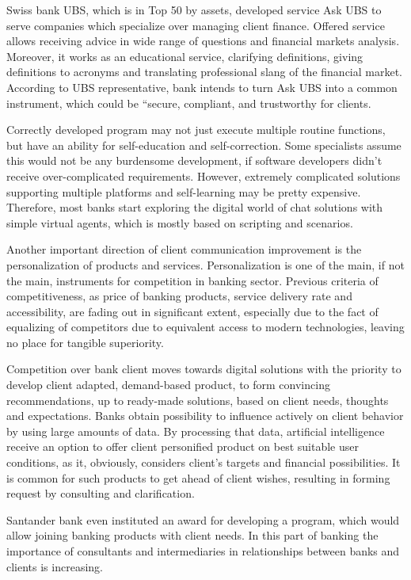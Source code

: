 Swiss bank UBS, which is in Top 50 by assets, developed service Ask UBS to serve companies which specialize over managing client finance.
Offered service allows receiving advice in wide range of questions and financial markets analysis.
Moreover, it works as an educational service, clarifying definitions, giving definitions to acronyms and translating professional slang of the financial market.
According to UBS representative, bank intends to turn Ask UBS into a common instrument, which could be “secure, compliant, and trustworthy for clients.
\cite{ways_ai_transforming_bi}

Correctly developed program may not just execute multiple routine functions, but have an ability for self-education and self-correction.
Some specialists assume this would not be any burdensome development, if software developers didn't receive over-complicated requirements.
However, extremely complicated solutions supporting multiple platforms and self-learning may be pretty expensive.
Therefore, most banks start exploring the digital world of chat solutions with simple virtual agents, which is mostly based on scripting and scenarios.

Another important direction of client communication improvement is the personalization of products and services.
Personalization is one of the main, if not the main, instruments for competition in banking sector.
Previous criteria of competitiveness, as price of banking products,  service delivery rate and accessibility, are fading out in significant extent, especially due to the fact of equalizing of competitors due to equivalent access to modern technologies, leaving no place for tangible superiority.

Competition over bank client moves towards digital solutions with the priority to develop client adapted, demand-based product, to form convincing recommendations, up to ready-made solutions, based on client needs, thoughts and expectations.
Banks obtain possibility to influence actively on client behavior by using large amounts of data.
By processing that data, artificial intelligence receive an option to offer client personified product on best suitable user conditions, as it, obviously, considers client's targets and financial possibilities.
It is common for such products to get ahead of client wishes, resulting in forming request by consulting and clarification.
\cite{ai_transform_disrupt}

Santander bank even instituted an award for developing a program, which would allow joining banking products with client needs.
\cite{ways_ai_transforming_bi}
In this part of banking the importance of consultants and intermediaries in relationships between banks and clients is increasing.

